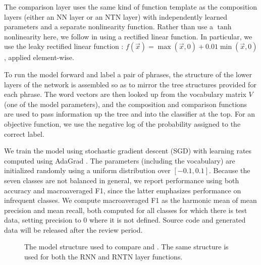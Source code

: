 The comparison layer uses the same kind of function template as the
composition layers (either an NN layer or an NTN layer) with
independently learned parameters and a separate nonlinearity function.
Rather than use a $\tanh$ nonlinearity here, we follow \cite{bowman2013can} 
in using a rectified linear function. In
particular, we use the leaky rectified linear function
\cite{maasrectifier}: $f(\vec{x})=\max(\vec{x}, 0) +
0.01\min(\vec{x}, 0)$, applied element-wise.

To run the model forward and label a pair of phrases, the structure of
the lower layers of the network is assembled so as to mirror the tree
structures provided for each phrase. The word vectors are then looked
up from the vocabulary matrix $V$ (one of the model parameters), and
the composition and comparison functions are used to pass information
up the tree and into the classifier at the top. For an objective
function, we use the negative log of the probability assigned to the
correct label.

We train the model using stochastic gradient descent (SGD)
with learning rates computed using AdaGrad \cite{duchi2011adaptive}.
The parameters (including the vocabulary) are initialized randomly 
using a uniform distribution over $[-0.1, 0.1]$.
Because the seven classes are not balanced in general, we report performance
using both accuracy and macroaveraged F1, since the latter emphasizes
 performance on infrequent classes. We compute macroaveraged F1 
as the harmonic mean of mean precision and mean recall, both computed
for all classes for which there is test data, setting precision to 0 
where it is not defined. Source code and generated data will be released
after the review period.

\begin{figure}[tp]
  \centering
  
  \caption{The model structure used to compare  and . 
    The same structure is used for both the RNN and RNTN layer functions.} 
  \label{sample-figure}
\end{figure}



